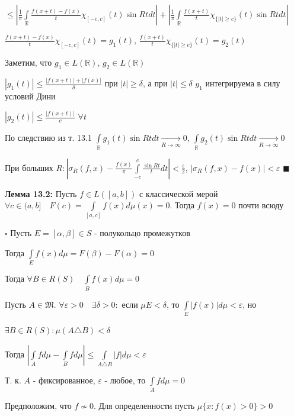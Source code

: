 \documentclass[a4paper]{report}
\begin{document}
\noindent$\le\left|\displaystyle\frac1\pi\displaystyle\int\limits_{\mathbb R}\frac{f(x+t)-f(x)}{t}\chi_{[-c,c]}(t)\sin Rtdt\right|+\left|\displaystyle\frac1\pi\displaystyle\int\limits_{\mathbb R}\frac{f(x+t)}{t}\chi_{\{|t|\ge c\}}(t)\sin Rtdt\right|$

$\displaystyle\frac{f(x+t)-f(x)}{t}\chi_{[-c,c]}(t)=g_1(t)$, $\displaystyle\frac{f(x+t)}{t}\chi_{\{|t|\ge c\}}(t)=g_2(t)$

Заметим, что $g_1\in L(\mathbb R)$, $g_2\in L(\mathbb R)$

$|g_1(t)|\le\displaystyle\frac{|f(x+t)|+|f(x)|}{\delta}$ при $|t|\ge\delta$, а при $|t|\le\delta$ $g_1$ интегрируема в силу условий Дини

$|g_2(t)|\le\displaystyle\frac{|f(x+t)|}{c}$ $\forall t$

По следствию из т. 13.1 $\displaystyle\int\limits_{\mathbb R}g_1(t)\sin Rtdt\xrightarrow[R\to\infty]{}0$, $\displaystyle\int\limits_{\mathbb R}g_2(t)\sin Rtdt\xrightarrow[R\to\infty]{}0$

При больших $R\colon\left|\sigma_R(f,x)-\displaystyle\frac{f(x)}{\pi}\displaystyle\int\limits_{-c}^c\frac{\sin Rt}{t}dt\right|<\displaystyle\frac{\varepsilon}{2}$, $\left|\sigma_R(f,x)-f(x)\right|<\varepsilon$ $\blacksquare$
\bigskip

\noindent\textbf{Лемма 13.2:} Пусть $f\in L([a,b])$ с классической мерой $\forall c\in(a,b]\quad F(c)=\displaystyle\int\limits_{[a,c]}f(x)d\mu(x)=0$. Тогда $f(x)=0$ почти всюду

\noindent $\square$ Пусть $E=[\alpha,\beta]\in S$ - полукольцо промежутков

Тогда $\displaystyle\int\limits_E f(x)d\mu=F(\beta)-F(\alpha)=0$

Тогда $\forall B\in R(S)\quad\displaystyle\int\limits_B f(x)d\mu=0$

Пусть $A\in\mathfrak M$. $\forall\varepsilon>0\quad\exists\delta>0\colon$ если $\mu E<\delta$, то $\displaystyle\int\limits_E|f(x)|d\mu<\varepsilon$, но 

\noindent $\exists B\in R(S)\colon\mu(A\triangle B)<\delta$

Тогда $\left|\displaystyle\int\limits_A fd\mu-\displaystyle\int\limits_B fd\mu\right|\le\displaystyle\int\limits_{A\triangle B}|f|d\mu<\varepsilon$

Т. к. $A$ - фиксированное, $\varepsilon$ - любое, то $\displaystyle\int\limits_A fd\mu=0$

Предположим, что $f\nsim0$. Для определенности пусть $\mu\{x\colon f(x)>0\}>0$
\end{document}
